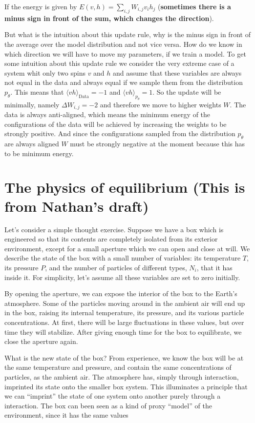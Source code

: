 \documentclass[nofootinbib, superscriptaddress, prl]{revtex4}
\begin{document}
If the energy is given by $E(v,h) = \sum_{i,j} W_{i,j} v_i h_j $ (\textbf{sometimes there is a minus sign in front of the sum, which changes the direction}).

But what is the intuition about this update rule, why is the minus sign in front of the average over the model distribution and not vice versa. How do we know in which direction we will have to move my parameters, if we train a model.
To get some intuition about this update rule we consider the very extreme case of a system whit only two spins $v$ and $h$ and assume that these variables are always not equal in the data and always equal if we sample them from the distribution $p_{\theta}$. This means that $\langle v h \rangle_{\text{Data}} = -1$
 and $\langle v h \rangle_{p_{\theta}}  = 1$. So the update will be minimally, namely $\Delta W_{i,j} = -2$ and therefore we move to higher weights $W$. The data is always anti-aligned, which means the minimum energy of the configurations of the data will be achieved by increasing the weights to be strongly positive. And since the configurations sampled from the distribution $p_{\theta}$ are always aligned $W$ must be strongly negative at the moment because this has to be minimum energy.


\section{The physics of equilibrium (This is from Nathan's draft)}



Let's consider a simple thought exercise. Suppose we have a box which is engineered so that its contents are completely isolated from its exterior environment, except for a small aperture which we can open and close at will. We describe the state of the box with a small number of variables: its temperature $T$, its pressure $P$, and the number of particles of different types, $N_i$, that it has inside it. For simplicity, let's assume all these variables are set to zero initially. 

By opening the aperture, we can expose the interior of the box to the Earth's atmosphere. Some of the particles moving around in the ambient air will end up in the box, raising its internal temperature, its pressure, and its various particle concentrations. At first, there will be large fluctuations in these values, but over time they will stabilize. After giving enough time for the box to equilibrate, we close the aperture again. 

What is the new state of the box? From experience, we know the box will be at the same temperature and pressure, and contain the same concentrations of particles, as the ambient air. The atmosphere has, simply through interaction, imprinted its state onto the smaller box system. 
This illuminates a principle that we can ``imprint'' the state of one system onto another purely through a interaction. The box can been seen as a kind of proxy ``model'' of the environment, since it has the same values 
\end{document}

